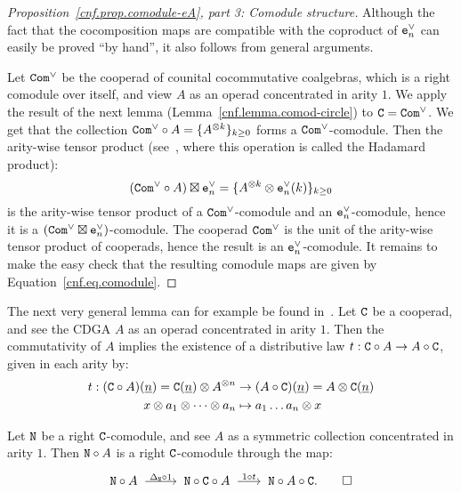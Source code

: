 \begin{proof}[Proposition~\ref{cnf.prop.comodule-eA}, part 3: Comodule structure]
  Although the fact that the cocomposition maps are compatible with the coproduct of $\mathtt{e}_{n}^{\vee}$ can easily be proved ``by hand'', it also follows from general arguments.

  Let $\mathtt{Com}^{\vee}$ be the cooperad of counital cocommutative coalgebras, which is a right comodule over itself, and view $A$ as an operad concentrated in arity $1$.
  We apply the result of the next lemma (Lemma~\ref{cnf.lemma.comod-circle}) to $\mathtt{C} = \mathtt{Com}^{\vee}$.
  We get that the collection $\mathtt{Com}^{\vee} \circ A = \{ A^{\otimes k} \}_{k \geq 0}$ forms a $\mathtt{Com}^{\vee}$-comodule.
  Then the arity-wise tensor product (see~\cite[Section 5.1.12]{LodayVallette2012}, where this operation is called the Hadamard product):
  \[ (\mathtt{Com}^{\vee} \circ A) \boxtimes \mathtt{e}_{n}^{\vee} = \{ A^{\otimes k} \otimes \mathtt{e}_{n}^{\vee}(k) \}_{k \geq 0} \]
  is the arity-wise tensor product of a $\mathtt{Com}^{\vee}$-comodule and an $\mathtt{e}_{n}^{\vee}$-comodule, hence it is a $(\mathtt{Com}^{\vee} \boxtimes \mathtt{e}_{n}^{\vee})$-comodule.
  The cooperad $\mathtt{Com}^{\vee}$ is the unit of the arity-wise tensor product of cooperads, hence the result is an $\mathtt{e}_{n}^{\vee}$-comodule.
  It remains to make the easy check that the resulting comodule maps are given by Equation~\eqref{cnf.eq.comodule}.
\end{proof}

The next very general lemma can for example be found in~\cite[Section 5.2]{CamposWillwacher2016}.
Let $\mathtt{C}$ be a cooperad, and see the CDGA $A$ as an operad concentrated in arity $1$.
Then the commutativity of $A$ implies the existence of a distributive law $t : \mathtt{C} \circ A \to A \circ \mathtt{C}$, given in each arity by:
\begin{align*}
  t : (\mathtt{C} \circ A)(\underline{n}) = \mathtt{C}(\underline{n}) \otimes A^{\otimes n}
  & \to (A \circ \mathtt{C})(\underline{n}) = A \otimes \mathtt{C}(\underline{n}) \\
  x \otimes a_{1} \otimes \dots \otimes a_{n}
  & \mapsto a_{1} \dots a_{n} \otimes x
\end{align*}

\begin{lemma}
  \label{cnf.lemma.comod-circle}
  Let $\mathtt{N}$ be a right $\mathtt{C}$-comodule, and see $A$ as a symmetric collection concentrated in arity $1$.
  Then $\mathtt{N} \circ A$ is a right $\mathtt{C}$-comodule through the map:
  \[ \NN \circ A \tkrightarrow{\Delta_{\NN} \circ 1} \NN \circ \CC \circ A \tkrightarrow{1 \circ t} \NN \circ A \circ \CC.
    \qed \]
\end{lemma}

